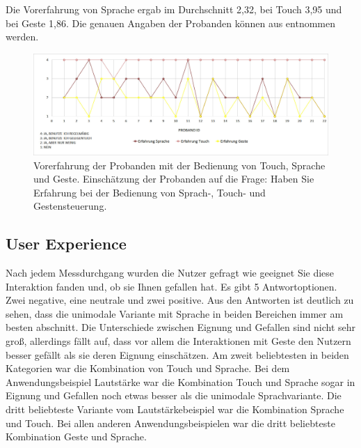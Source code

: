 Die Vorerfahrung von Sprache ergab im Durchschnitt 2,32, bei Touch 3,95 und bei Geste 1,86. Die genauen Angaben der Probanden können aus  entnommen werden.
\begin{figure}[ht]
  \centering
  \includegraphics[width=1\textwidth]{img/ErfahrungProbanden2.jpg}
  \caption[Vorerfahrung der Probanden]{Vorerfahrung der Probanden mit der Bedienung von Touch, Sprache und Geste. Einschätzung der Probanden auf die Frage: Haben Sie Erfahrung bei der Bedienung von Sprach-, Touch- und Gestensteuerung.}
  \label{fig:Vorerfahrung}
\end{figure} 
\subsection[User Experience]{User Experience}
Nach jedem Messdurchgang wurden die Nutzer gefragt wie geeignet Sie diese Interaktion fanden und, ob sie Ihnen gefallen hat. Es gibt 5 Antwortoptionen. Zwei negative, eine neutrale und zwei positive. Aus den Antworten ist deutlich zu sehen, dass die unimodale Variante mit Sprache in beiden Bereichen immer am besten abschnitt. Die Unterschiede zwischen Eignung und Gefallen sind nicht sehr groß, allerdings fällt auf, dass vor allem die Interaktionen mit Geste den Nutzern besser gefällt als sie deren Eignung einschätzen. Am zweit beliebtesten in beiden Kategorien war die Kombination von Touch und Sprache. Bei dem Anwendungsbeispiel Lautstärke war die Kombination Touch und Sprache sogar in Eignung und Gefallen noch etwas besser als die unimodale Sprachvariante. Die dritt beliebteste Variante vom Lautstärkebeispiel war die Kombination Sprache und Touch. Bei allen anderen Anwendungsbeispielen war die dritt beliebteste Kombination Geste und Sprache. 

